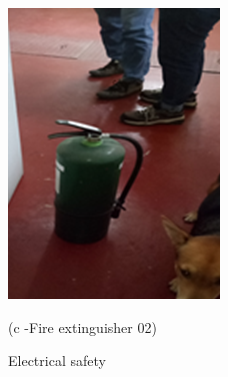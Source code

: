 \begin{figure}
\begin{minipage}[b]{0.25\linewidth}
			\includegraphics[width=\textwidth]{figures/fig_ch04_fdas_fireex02}
		\caption*{(c -Fire extinguisher 02)}
	\end{minipage}
	\caption{Electrical safety}
	\label{ch04_fig_fdas02}
\end{figure}